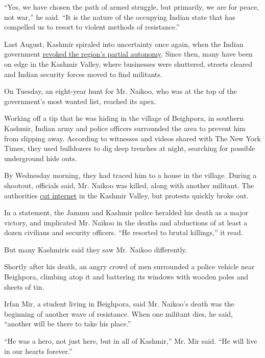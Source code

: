 ``Yes, we have chosen the path of armed struggle, but primarily, we are
for peace, not war,'' he said. ``It is the nature of the occupying
Indian state that has compelled us to resort to violent methods of
resistance.''

Last August, Kashmir spiraled into uncertainty once again, when the
Indian government
\href{https://www.nytimes.com/2019/08/05/world/asia/india-pakistan-kashmir-jammu.html}{revoked
the region's partial autonomy}. Since then, many have been on edge in
the Kashmir Valley, where businesses were shuttered, streets cleared and
Indian security forces moved to find militants.

On Tuesday, an eight-year hunt for Mr. Naikoo, who was at the top of the
government's most wanted list, reached its apex.

Working off a tip that he was hiding in the village of Beighpora, in
southern Kashmir, Indian army and police officers surrounded the area to
prevent him from slipping away. According to witnesses and videos shared
with The New York Times, they used bulldozers to dig deep trenches at
night, searching for possible underground hide outs.

By Wednesday morning, they had traced him to a house in the village.
During a shootout, officials said, Mr. Naikoo was killed, along with
another militant. The authorities
\href{https://www.thehindu.com/news/national/other-states/mobile-internet-suspended-in-kashmir-as-top-hizb-commander-riaz-naikoo-trapped-in-encounter/article31515428.ece}{cut
internet} in the Kashmir Valley, but protests quickly broke out.

In a statement, the Jammu and Kashmir police heralded his death as a
major victory, and implicated Mr. Naikoo in the deaths and abductions of
at least a dozen civilians and security officers. ``He resorted to
brutal killings,'' it read.

But many Kashmiris said they saw Mr. Naikoo differently.

Shortly after his death, an angry crowd of men surrounded a police
vehicle near Beighpora, climbing atop it and battering its windows with
wooden poles and sheets of tin.

Irfan Mir, a student living in Beighpora, said Mr. Naikoo's death was
the beginning of another wave of resistance. When one militant dies, he
said, ``another will be there to take his place.''

``He was a hero, not just here, but in all of Kashmir,'' Mr. Mir said.
``He will live in our hearts forever.''

